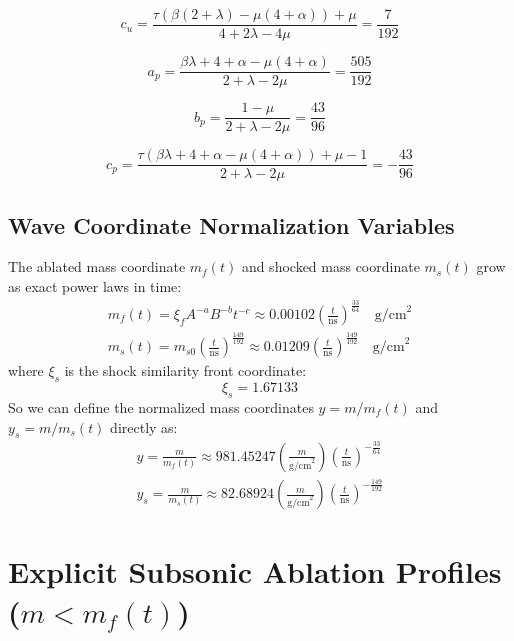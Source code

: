 \documentclass[11pt]{article}
\begin{document}
\begin{equation}
c_u = \frac{\tau\left(\beta(2 + \lambda) - \mu(4 + \alpha)\right) + \mu}{4 + 2\lambda - 4\mu} = \frac{7}{192}
\end{equation}

\begin{equation}
a_p = \frac{\beta\lambda + 4 + \alpha - \mu(4 + \alpha)}{2 + \lambda - 2\mu} = \frac{505}{192}
\end{equation}

\begin{equation}
b_p = \frac{1 - \mu}{2 + \lambda - 2\mu} = \frac{43}{96}
\end{equation}

\begin{equation}
c_p = \frac{\tau\left(\beta\lambda + 4 + \alpha - \mu(4 + \alpha)\right) + \mu - 1}{2 + \lambda - 2\mu} = -\frac{43}{96}
\end{equation}

\subsection{Wave Coordinate Normalization Variables}
The ablated mass coordinate $m_f(t)$ and shocked mass coordinate $m_s(t)$ grow as exact power laws in time:
\begin{gather}
    m_f(t) = \xi_f A^{-a} B^{-b} t^{-c} \approx 0.00102 \left(\frac{t}{\text{ns}}\right)^{\frac{33}{64}} \quad \text{g/cm}^2 \\
    m_s(t) = m_{s0} \left(\frac{t}{\text{ns}}\right)^{\frac{149}{192}} \approx 0.01209 \left(\frac{t}{\text{ns}}\right)^{\frac{149}{192}} \quad \text{g/cm}^2
\end{gather}
where $\xi_s$ is the shock similarity front coordinate:
\begin{equation}
    \xi_s = 1.67133
\end{equation}
So we can define the normalized mass coordinates $y = m/m_f(t)$ and $y_s = m/m_s(t)$ directly as:
\begin{gather}
    y = \frac{m}{m_f(t)} \approx 981.45247 \left(\frac{m}{\text{g/cm}^2}\right) \left(\frac{t}{\text{ns}}\right)^{-\frac{33}{64}} \\
    y_s = \frac{m}{m_s(t)} \approx 82.68924 \left(\frac{m}{\text{g/cm}^2}\right) \left(\frac{t}{\text{ns}}\right)^{-\frac{149}{192}}
\end{gather}

\section{Explicit Subsonic Ablation Profiles ($m < m_f(t)$)}
\end{document}
